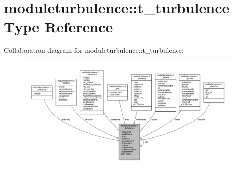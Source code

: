 \hypertarget{structmoduleturbulence_1_1t__turbulence}{}\section{moduleturbulence\+:\+:t\+\_\+turbulence Type Reference}
\label{structmoduleturbulence_1_1t__turbulence}


Collaboration diagram for moduleturbulence\+:\+:t\+\_\+turbulence\+:\nopagebreak
\begin{figure}[H]
\begin{center}
\leavevmode
\includegraphics[width=350pt]{structmoduleturbulence_1_1t__turbulence__coll__graph}
\end{center}
\end{figure}
